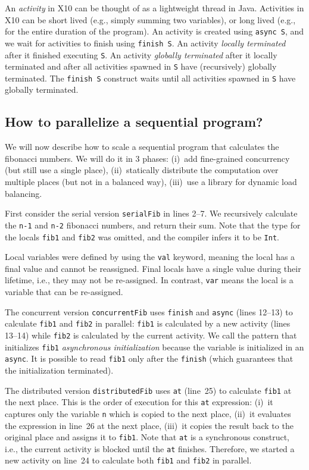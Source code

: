 \documentclass[a4paper]{article}
\def\codesmaller{\small}
\newcommand{\code}[1]{\texttt{\textup{\codesmaller #1}}}
\begin{document}
An \emph{activity} in X10 can be thought of as a lightweight thread in Java.
Activities in X10 can be short lived (e.g., simply summing two variables),
    or long lived (e.g., for the entire duration of the program).
An activity is created using \code{async S}, and we wait for activities to finish using \code{finish S}.
An activity \emph{locally terminated} after it finished executing \code{S}.
An activity \emph{globally terminated} after it locally terminated and
    after all activities spawned in \code{S} have (recursively) globally terminated.
The \code{finish S} construct waits until all activities spawned in \code{S} have globally terminated.

\subsection{How to parallelize a sequential program?}
We will now describe how to scale a sequential program that calculates the fibonacci numbers.
We will do it in 3 phases:
(i)~add fine-grained concurrency (but still use a single place),
(ii)~statically distribute the computation over multiple places (but not in a balanced way),
(iii)~use a library for dynamic load balancing.

First consider the serial version \code{serialFib} in lines 2--7.
We recursively calculate the \code{n-1} and \code{n-2} fibonacci numbers, and return their sum.
Note that the type for the locals \code{fib1} and \code{fib2} was omitted, and the compiler infers it to be \code{Int}.

Local variables were defined by using the \code{val} keyword, meaning the local has a final value
    and cannot be reassigned.
Final locals have a single value during their lifetime, i.e., they may not be re-assigned.
In contrast, \code{var} means the local is a variable that can be re-assigned.

The concurrent version \code{concurrentFib} uses \code{finish} and \code{async} (lines 12--13)
    to calculate \code{fib1} and \code{fib2} in parallel:
    \code{fib1} is calculated by a new activity (lines 13--14)
    while \code{fib2} is calculated by the current activity.
We call the pattern that initializes \code{fib1} \emph{asynchronous initialization}
    because the variable is initialized in an \code{async}.
It is possible to read \code{fib1} only after the \code{finish} (which guarantees that the initialization terminated).

The distributed version \code{distributedFib} uses \code{at} (line~25) to calculate \code{fib1} at the next place.
This is the order of execution for this \code{at} expression:
    (i)~it captures only the variable \code{n} which is copied to the next place,
    (ii)~it evaluates the expression in line~26 at the next place,
    (iii)~it copies the result back to the original place and assigns it to \code{fib1}.
Note that \code{at} is a synchronous construct, i.e., the current activity is blocked until the \code{at} finishes.
Therefore, we started a new activity on line~24 to calculate both \code{fib1} and \code{fib2} in parallel.
\end{document}
